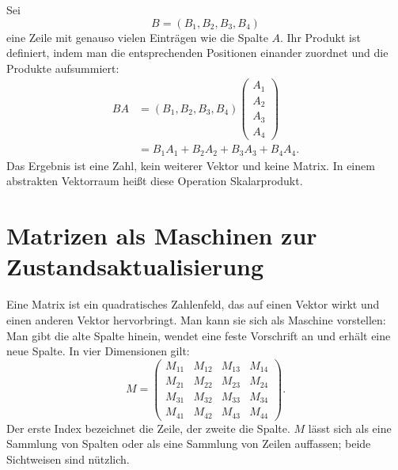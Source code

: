 Sei
\begin{equation}
  B=(B_1,B_2,B_3,B_4)
\end{equation}
eine Zeile mit genauso vielen Einträgen wie die Spalte \(A\). Ihr Produkt ist definiert, indem man die entsprechenden Positionen einander zuordnet und die Produkte aufsummiert:
\begin{align}
  BA
  &=
  (B_1,B_2,B_3,B_4)
  \begin{pmatrix}
    A_1\\ A_2\\ A_3\\ A_4
  \end{pmatrix}\\
  &=B_1A_1+B_2A_2+B_3A_3+B_4A_4.
  \label{eq:l01-inner-product}
\end{align}
Das Ergebnis ist eine Zahl, kein weiterer Vektor und keine Matrix. In einem abstrakten Vektorraum heißt diese Operation Skalarprodukt.

\begin{classroomqa}
\end{classroomqa}

\section{Matrizen als Maschinen zur Zustandsaktualisierung}

Eine Matrix ist ein quadratisches Zahlenfeld, das auf einen Vektor wirkt und einen anderen Vektor hervorbringt. Man kann sie sich als Maschine vorstellen: Man gibt die alte Spalte hinein, wendet eine feste Vorschrift an und erhält eine neue Spalte. In vier Dimensionen gilt:
\begin{equation}
  M=
  \begin{pmatrix}
    M_{11}&M_{12}&M_{13}&M_{14}\\
    M_{21}&M_{22}&M_{23}&M_{24}\\
    M_{31}&M_{32}&M_{33}&M_{34}\\
    M_{41}&M_{42}&M_{43}&M_{44}
  \end{pmatrix}.
  \label{eq:l01-general-matrix}
\end{equation}
Der erste Index bezeichnet die Zeile, der zweite die Spalte. \(M\) lässt sich als eine Sammlung von Spalten oder als eine Sammlung von Zeilen auffassen; beide Sichtweisen sind nützlich.

